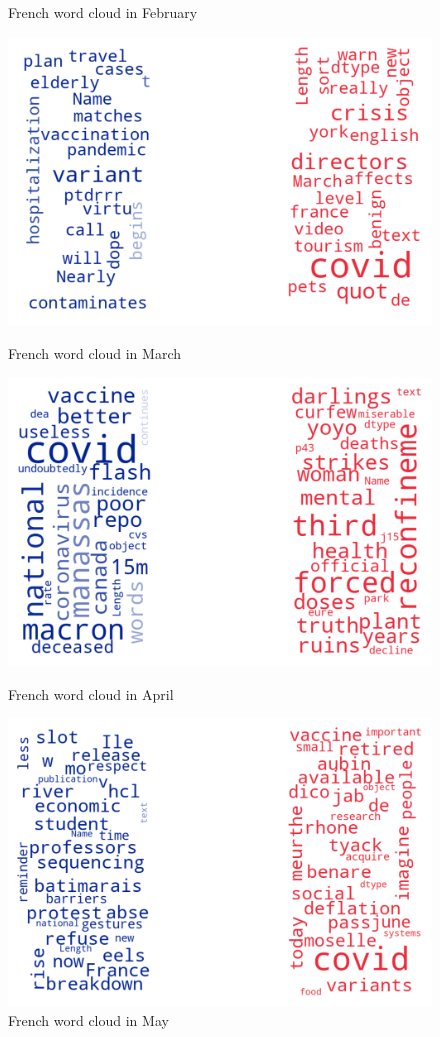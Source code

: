 \begin{landscape}
\begin{figure}[!htb]
  \caption{French word cloud in February}\label{fig:februaryfr}
\endminipage
\end{figure}
\begin{figure}[!htb]
  \includegraphics[width=\linewidth]{March fr word cloud.png}
  \caption{French word cloud in March}\label{fig:marchfr}
\endminipage\hfill
{}
  \includegraphics[width=\linewidth]{April fr word cloud.png}
  \caption{French word cloud in April}\label{fig:aprilfr}
\endminipage\hfill
{}
  \includegraphics[width=\linewidth]{May fr word cloud.png}
  \caption{French word cloud in May}\label{fig:mayfr}
\endminipage
\end{figure}


\end{landscape}
